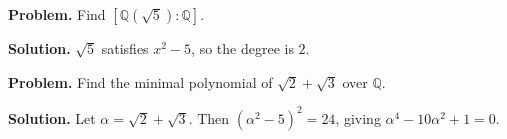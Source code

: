 \begin{example}\label{ex:sec1-9}
\textbf{Problem.} Find $[\mathbb{Q}(\sqrt{5}):\mathbb{Q}]$.

\textbf{Solution.} $\sqrt{5}$ satisfies $x^2-5$, so the degree is $2$.
\end{example}

\begin{example}\label{ex:sec1-10}
\textbf{Problem.} Find the minimal polynomial of $\sqrt{2}+\sqrt{3}$ over $\mathbb{Q}$.

\textbf{Solution.} Let $\alpha=\sqrt{2}+\sqrt{3}$. Then $(\alpha^2-5)^2=24$, giving $\alpha^4-10\alpha^2+1=0$.
\end{example}
